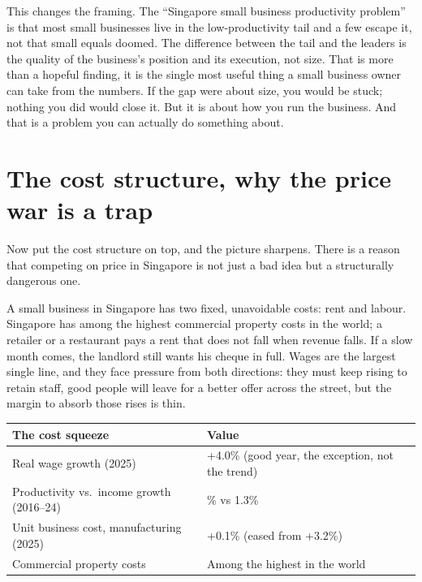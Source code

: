 \documentclass[10pt,twoside,openany]{memoir}
\newcommand{\needspacehead}{\needspace{4\baselineskip}}
\let\oldsection\section
\renewcommand{\section}{\needspacehead\oldsection}
\renewcommand{\arraystretch}{1.1}
\begin{document}
{{{{{{{{{This changes the framing. The ``Singapore small business productivity
problem'' is that most small businesses live in the low-productivity
tail and a few escape it, not that small equals doomed. The difference
between the tail and the leaders is the quality of the business's
position and its execution, not size. That is more than a hopeful
finding, it is the single most useful thing a small business owner can
take from the numbers. If the gap were about size, you would be stuck;
nothing you did would close it. But it is about how you run the
business. And that is a problem you can actually do something about.

\section{The cost structure, why the price war is a
trap}\label{the-cost-structure-why-the-price-war-is-a-trap}

Now put the cost structure on top, and the picture sharpens. There is a
reason that competing on price in Singapore is not just a bad idea but a
structurally dangerous one.

A small business in Singapore has two fixed, unavoidable costs: rent and
labour. Singapore has among the highest commercial property costs in the
world; a retailer or a restaurant pays a rent that does not fall when
revenue falls. If a slow month comes, the landlord still wants his
cheque in full. Wages are the largest single line, and they face
pressure from both directions: they must keep rising to retain staff,
good people will leave for a better offer across the street, but the
margin to absorb those rises is thin.

{\def\LTcaptype{none} %
{\renewcommand{\arraystretch}{0.9}\begin{longtable}[]{@{}
  >{\raggedright\arraybackslash}p{}
  >{\raggedright\arraybackslash}p{}@{}}
\toprule\noalign{}
\begin{minipage}[b]{\linewidth}\raggedright
The cost squeeze
\end{minipage} & \begin{minipage}[b]{\linewidth}\raggedright
Value
\end{minipage} \\
\midrule\noalign{}
\endhead
\bottomrule\noalign{}
\endlastfoot
Real wage growth (2025) & +4.0\% (good year, the exception, not the
trend) \\
Productivity vs.~income growth (2016--24) & 2.5\% vs 1.3\% \\
Unit business cost, manufacturing (2025) & +0.1\% (eased from +3.2\%) \\
Commercial property costs & Among the highest in the world \\
\end{longtable}
}

}}}}}}}}}}
\end{document}
